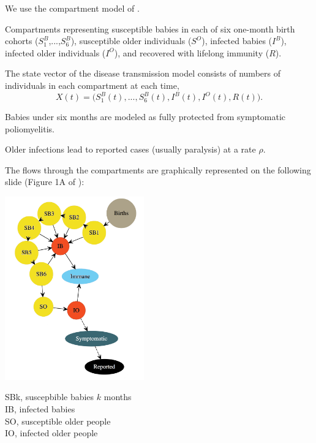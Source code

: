 \begin{frame}[fragile]

\bi

\item We use the compartment model of \citet{Martinez-Bakker2015}.

\item Compartments representing susceptible babies in each of six one-month birth cohorts ($S^B_1$,...,$S^B_6$), susceptible older individuals ($S^O$), infected babies ($I^B$), infected older individuals ($I^O$), and recovered with lifelong immunity ($R$). 

\item The state vector of the disease transmission model consists of numbers of individuals in each compartment at each time, 
$$X(t)=\big(S^B_1(t),...,S^B_6(t), I^B(t),I^O(t),R(t) \big).$$

\item Babies under six months are modeled as fully protected from symptomatic poliomyelitis.

\item Older infections lead to reported cases (usually paralysis) at a rate $\rho$. 

\item The flows through the compartments are graphically represented on the following slide (Figure 1A of \citet{Martinez-Bakker2015}):

\ei

\end{frame}

\begin{frame}[fragile]

\includegraphics[width=6cm]{polio_fig1A.png} \hspace{-5mm}\parbox[b]{5.5cm}{
SBk, suscepbible babies $k$ months\\
IB, infected babies\\
SO, susceptible older people\\
IO, infected older people

\vspace{3cm}

}

\end{frame}


